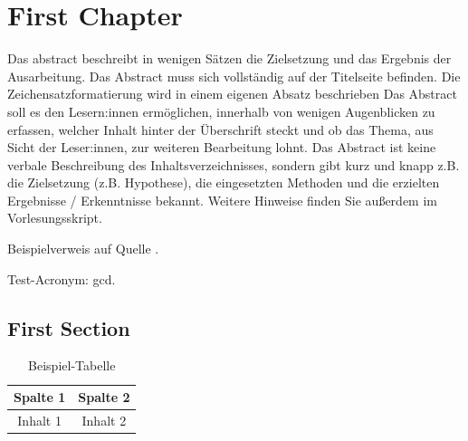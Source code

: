 




\iffalse
	\chapter{First Chapter}

	Das \gls{abstract} beschreibt in wenigen Sätzen die Zielsetzung und das Ergebnis der Ausarbeitung. Das Abstract muss sich vollständig auf der Titelseite befinden. Die Zeichensatzformatierung wird in einem eigenen Absatz beschrieben  Das Abstract soll es den Lesern:innen ermöglichen, innerhalb von wenigen Augenblicken zu erfassen, welcher Inhalt hinter der Überschrift steckt und ob das Thema, aus Sicht der Leser:innen, zur weiteren Bearbeitung lohnt. Das Abstract ist keine verbale Beschreibung des Inhaltsverzeichnisses, sondern gibt kurz und knapp z.B. die Zielsetzung (z.B. Hypothese), die eingesetzten Methoden und die erzielten Ergebnisse / Erkenntnisse bekannt. Weitere Hinweise finden Sie außerdem im Vorlesungsskript.

	Beispielverweis auf Quelle \cite{ahrensAbschlussarbeiten}.

	Test-Acronym: \acrshort{gcd}.

	\section{First Section}

	\begin{table}[h]
		\centering
		\begin{tabular}{|c|c|}
			\hline
			Spalte 1 & Spalte 2 \\
			\hline
			Inhalt 1 & Inhalt 2 \\
			\hline
		\end{tabular}
		\caption{Beispiel-Tabelle}
		\label{tab:example}
	\end{table}

